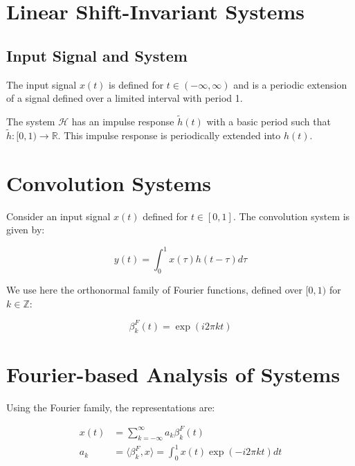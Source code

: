 \documentclass[12pt]{article}
\begin{document}
\section{Linear Shift-Invariant Systems}

\subsection{Input Signal and System}

The input signal $x(t)$ is defined for $t \in (-\infty, \infty)$ and is a periodic extension of a signal defined over a limited interval with period 1.

\begin{center}
\end{center}

The system $\mathcal{H}$ has an impulse response $\tilde{h}(t)$ with a basic period such that $\tilde{h} : [0,1) \rightarrow \mathbb{R}$. This impulse response is periodically extended into $h(t)$.

\section{Convolution Systems}

Consider an input signal $x(t)$ defined for $t \in [0,1]$. The convolution system is given by:

\begin{equation}
y(t) = \int_0^1 x(\tau) h(t - \tau) d\tau
\end{equation}

We use here the orthonormal family of Fourier functions, defined over $[0,1)$ for $k \in \mathbb{Z}$:

\begin{equation}
\beta_k^F(t) = \exp(i2\pi kt)
\end{equation}

\section{Fourier-based Analysis of Systems}

Using the Fourier family, the representations are:

\begin{align}
x(t) &= \sum_{k=-\infty}^{\infty} a_k \beta_k^F(t) \\
a_k &= \langle \beta_k^F, x \rangle = \int_0^1 x(t) \exp(-i2\pi kt) dt
\end{align}
\end{document}
